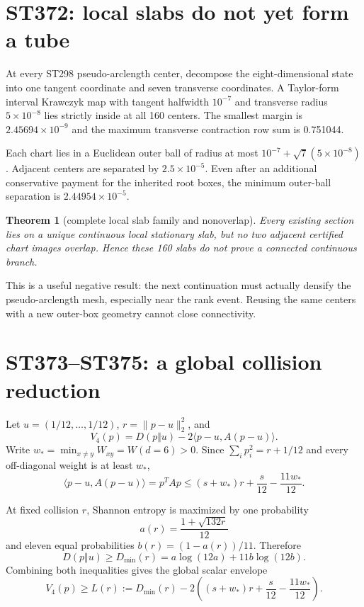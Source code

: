 \documentclass[11pt,a4paper]{article}
\newtheorem{theorem}{Theorem}[section]
\begin{document}
\section{ST372: local slabs do not yet form a tube}

At every ST298 pseudo-arclength center, decompose the eight-dimensional state into one
tangent coordinate and seven transverse coordinates. A Taylor-form interval Krawczyk map
with tangent halfwidth $10^{-7}$ and transverse radius $5\times10^{-8}$ lies strictly
inside at all 160 centers. The smallest margin is
$2.45694\times10^{-9}$ and the maximum transverse contraction row sum is 0.751044.

Each chart lies in a Euclidean outer ball of radius at most
$10^{-7}+\sqrt7(5\times10^{-8})$. Adjacent centers are separated by
$2.5\times10^{-5}$. Even after an additional conservative payment for the inherited root
boxes, the minimum outer-ball separation is $2.44954\times10^{-5}$.

\begin{theorem}[complete local slab family and nonoverlap]
Every existing section lies on a unique continuous local stationary slab, but no two
adjacent certified chart images overlap. Hence these 160 slabs do not prove a connected
continuous branch.
\end{theorem}

This is a useful negative result: the next continuation must actually densify the
pseudo-arclength mesh, especially near the rank event. Reusing the same centers with a new
outer-box geometry cannot close connectivity.

\section{ST373--ST375: a global collision reduction}

Let $u=(1/12,\ldots,1/12)$,
$r=\lVert p-u\rVert_2^2$, and
\[
V_4(p)=D(p\Vert u)-2\langle p-u,A(p-u)\rangle.
\]
Write $w_*=\min_{x\ne y}W_{xy}=W(d=6)>0$. Since
$\sum_i p_i^2=r+1/12$ and every off-diagonal weight is at least $w_*$,
\[
\langle p-u,A(p-u)\rangle=p^TAp
\leq (s+w_*)r+\frac{s}{12}-\frac{11w_*}{12}.
\]

At fixed collision $r$, Shannon entropy is maximized by one probability
\[
a(r)=\frac{1+\sqrt{132r}}{12}
\]
and eleven equal probabilities $b(r)=(1-a(r))/11$. Therefore
\[
D(p\Vert u)\geq
D_{\min}(r)=a\log(12a)+11b\log(12b).
\]
Combining both inequalities gives the global scalar envelope
\[
V_4(p)\geq L(r):=D_{\min}(r)
-2\left((s+w_*)r+\frac{s}{12}-\frac{11w_*}{12}\right).
\]
\end{document}
